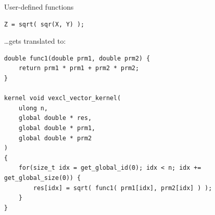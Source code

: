 \documentclass[@BEAMER_OPTIONS@]{beamer}
\begin{document}
\begin{frame}[fragile]{User-defined functions}
    \begin{exampleblock}{}
        \begin{lstlisting}
Z = sqrt( sqr(X, Y) );
        \end{lstlisting}
    \end{exampleblock}
    \begin{exampleblock}{\ldots gets translated to:}
        \begin{lstlisting}
double func1(double prm1, double prm2) {
    return prm1 * prm1 + prm2 * prm2;
}

kernel void vexcl_vector_kernel(
    ulong n,
    global double * res,
    global double * prm1,
    global double * prm2
)
{
    for(size_t idx = get_global_id(0); idx < n; idx += get_global_size(0)) {
        res[idx] = sqrt( func1( prm1[idx], prm2[idx] ) );
    }
}
        \end{lstlisting}
    \end{exampleblock}
\end{frame}
\end{document}
